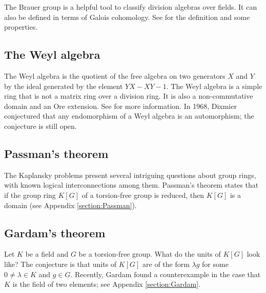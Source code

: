 The Brauer group is a helpful tool to classify division algebras over fields. It can also be defined in terms of Galois cohomology. 
See \cite{MR1233388} for the definition and some properties. 

\subsection*{The Weyl algebra}

The Weyl algebra is the quotient of the free algebra on two generators
$X$ and $Y$ by the ideal generated by the element
$YX-XY-1$. The Weyl algebra is a simple ring that is 
not a matrix ring over a division ring. It is also a non-commutative domain and an Ore extension. See \cite{MR1838439} for more information. 
In 1968, Dixmier conjectured that any 
endomorphism of a Weyl algebra is an automorphism; the conjecture
is still open. 

\subsection*{Passman's theorem}

The Kaplansky problems present several intriguing questions about group rings, with known logical interconnections among them. Passman's theorem states that if the group ring $K[G]$ of a torsion-free group
is reduced, then $K[G]$ is a domain (see Appendix \ref{section:Passman}).

\subsection*{Gardam's theorem}

Let $K$ be a field and $G$ be a torsion-free group. 
What do the units of $K[G]$ look like? The conjecture
is that units of $K[G]$ are of the form $\lambda g$ for
some $0\ne\lambda\in K$ and $g\in G$. Recently, 
Gardam \cite{MR4334981} found a counterexample 
in the case that 
$K$ is the field of two elements; see Appendix \ref{section:Gardam}. 





% 
